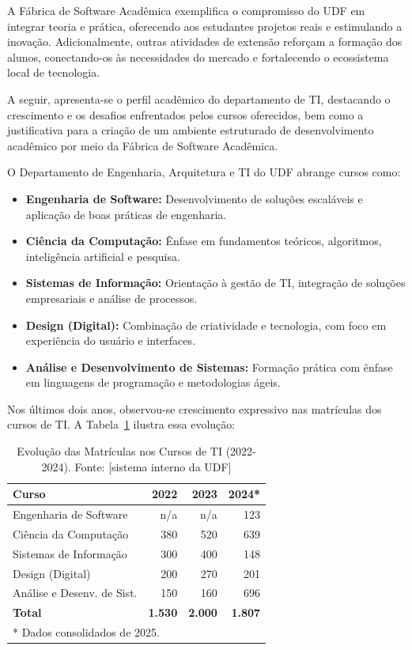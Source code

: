 \documentclass[
	12pt,           %
	openright,      %
	oneside,        %
	a4paper,        %
	brazil          %
]{abntex2}
\begin{document}
A Fábrica de Software Acadêmica exemplifica o compromisso do UDF em integrar teoria e prática, oferecendo aos estudantes projetos reais e estimulando a inovação. Adicionalmente, outras atividades de extensão reforçam a formação dos alunos, conectando-os às necessidades do mercado e fortalecendo o ecossistema local de tecnologia.

A seguir, apresenta-se o perfil acadêmico do departamento de TI, destacando o crescimento e os desafios enfrentados pelos cursos oferecidos, bem como a justificativa para a criação de um ambiente estruturado de desenvolvimento acadêmico por meio da Fábrica de Software Acadêmica.

O Departamento de Engenharia, Arquitetura e TI do UDF abrange cursos como:
\begin{itemize}
  \item \textbf{Engenharia de Software:} Desenvolvimento de soluções escaláveis e aplicação de boas práticas de engenharia.
  \item \textbf{Ciência da Computação:} Ênfase em fundamentos teóricos, algoritmos, inteligência artificial e pesquisa.
  \item \textbf{Sistemas de Informação:} Orientação à gestão de TI, integração de soluções empresariais e análise de processos.
  \item \textbf{Design (Digital):} Combinação de criatividade e tecnologia, com foco em experiência do usuário e interfaces.
  \item \textbf{Análise e Desenvolvimento de Sistemas:} Formação prática com ênfase em linguagens de programação e metodologias ágeis.
\end{itemize}

Nos últimos dois anos, observou-se crescimento expressivo nas matrículas dos cursos de TI. A Tabela~\ref{tab:matriculas-ti} ilustra essa evolução:

\begin{table}[ht]
\centering
\caption{Evolução das Matrículas nos Cursos de TI (2022-2024). Fonte: [sistema interno da UDF]}
\label{tab:matriculas-ti}
\begin{tabular}{lrrr}
\hline
\textbf{Curso} & \textbf{2022} & \textbf{2023} & \textbf{2024*} \\ \hline
Engenharia de Software & n/a & n/a & 123 \\ 
Ciência da Computação & 380 & 520 & 639 \\ 
Sistemas de Informação & 300 & 400 & 148 \\ 
Design (Digital) & 200 & 270 & 201 \\ 
Análise e Desenv. de Sist. & 150 & 160 & 696 \\ \hline
\textbf{Total} & \textbf{1.530} & \textbf{2.000} & \textbf{1.807} \\
\hline
\multicolumn{4}{l}{* Dados consolidados de 2025.}
\end{tabular}
\end{table}
\end{document}
